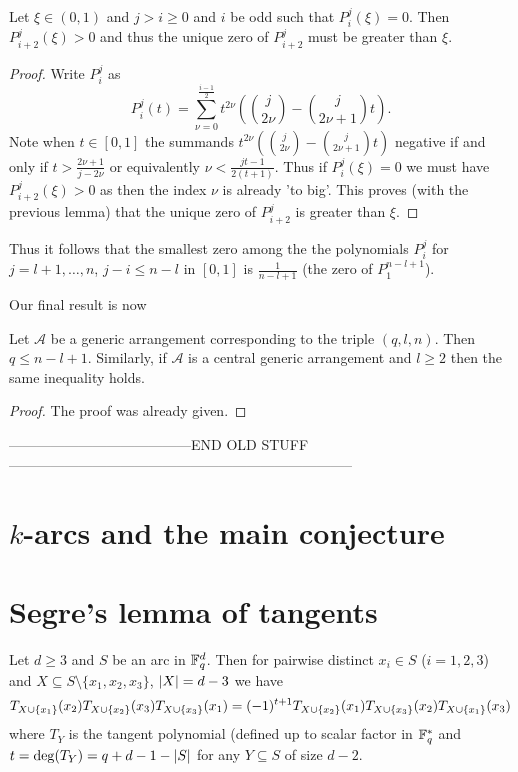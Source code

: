 \documentclass[a4paper]{article}
\begin{document}
\begin{lemma}
  Let $\xi\in(0,1)$ and $j>i\geq 0$ and $i$ be odd such that $P_i^j(\xi)=0$. Then $P_{i+2}^j(\xi)>0$ and thus the unique zero of $P_{i+2}^j$ must be greater than $\xi$.
\end{lemma}

\begin{proof}
  Write $P_i^j$ as
  \begin{equation}
    P_i^j(t)=\sum_{\nu=0}^{\frac{i-1}{2}}{t^{2\nu}\left(\binom{j}{2\nu}-\binom{j}{2\nu+1}t\right)}\text{.}
  \end{equation}
  Note when $t\in[0,1]$ the summands $t^{2\nu}\left(\binom{j}{2\nu}-\binom{j}{2\nu+1}t\right)$ negative if and only if $t>\frac{2\nu+1}{j-2\nu}$ or equivalently $\nu<\frac{jt-1}{2(t+1)}$. Thus if $P_i^j(\xi)=0$ we must have $P_{i+2}^j(\xi)>0$ as then the index $\nu$ is already 'to big'.
  This proves (with the previous lemma) that the unique zero of $P_{i+2}^j$ is greater than $\xi$.
\end{proof}

Thus it follows that the smallest zero among the the polynomials $P_i^j$ for $j=l+1,\ldots,n$, $j-i\leq n-l$ in $[0,1]$ is $\frac{1}{n-l+1}$ (the zero of $P_1^{n-l+1}$).

Our final result is now

\begin{lemma} Let $\mathcal{A}$ be a generic arrangement corresponding to the triple $(q,l,n)$. Then $q\leq n-l+1$. Similarly, if $\mathcal{A}$ is a central generic arrangement and $l\geq 2$ then the same inequality holds.
\end{lemma}

\begin{proof}
  The proof was already given.
\end{proof}

---------------------------------------END OLD STUFF--------------------------------------------------------------------------

\section{$k$-arcs and the main conjecture}

\section{Segre's lemma of tangents}

\begin{lemma}
  Let $d\geq3$ and $S$ be an arc in $\mathbb{F}_{q}^d$. Then for pairwise distinct $x_i\in S$ ($i=1,2,3$) and $X\subseteq S\setminus\{x_1,x_2,x_3\}$, $\left|X\right|=d-3$ we have
  \begin{equation}
    T_{X\cup\{x_1\}}(x_2)T_{X\cup\{x_2\}}(x_3)T_{X\cup\{x_3\}}(x_1)=(-1)^{t+1}T_{X\cup\{x_2\}}(x_1)T_{X\cup\{x_3\}}(x_2)T_{X\cup\{x_1\}}(x_3)
  \end{equation}
  where $T_Y$ is the tangent polynomial (defined up to scalar factor in $\mathbb{F}_{q}^*$ and $t=\deg(T_Y)=q+d-1-\left|S\right|$ for any $Y\subseteq S$ of size $d-2$.
\end{lemma}
\end{document}
